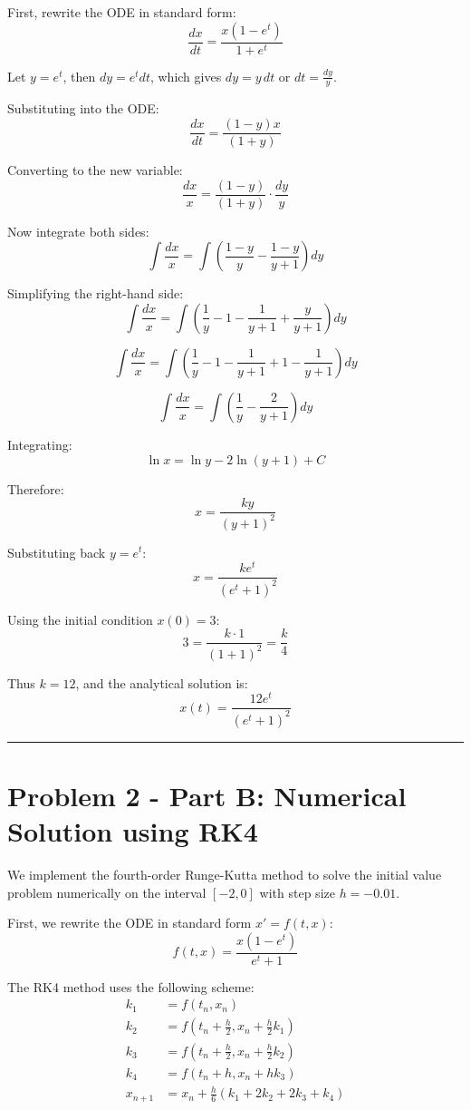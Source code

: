First, rewrite the ODE in standard form:
$$\frac{dx}{dt} = \frac{x(1-e^t)}{1+e^t}$$

Let $y = e^t$, then $dy = e^t dt$, which gives $dy = y\, dt$ or $dt = \frac{dy}{y}$.

Substituting into the ODE:
$$\frac{dx}{dt} = \frac{(1-y)x}{(1+y)}$$

Converting to the new variable:
$$\frac{dx}{x} = \frac{(1-y)}{(1+y)} \cdot \frac{dy}{y}$$

Now integrate both sides:
$$\int \frac{dx}{x} = \int \left(\frac{1-y}{y} - \frac{1-y}{y+1}\right) dy$$

Simplifying the right-hand side:
$$\int \frac{dx}{x} = \int \left(\frac{1}{y} - 1 - \frac{1}{y+1} + \frac{y}{y+1}\right) dy$$

$$\int \frac{dx}{x} = \int \left(\frac{1}{y} - 1 - \frac{1}{y+1} + 1 - \frac{1}{y+1}\right) dy$$

$$\int \frac{dx}{x} = \int \left(\frac{1}{y} - \frac{2}{y+1}\right) dy$$

Integrating:
$$\ln x = \ln y - 2\ln(y+1) + C$$

Therefore:
$$x = \frac{ky}{(y+1)^2}$$

Substituting back $y = e^t$:
$$x = \frac{ke^t}{(e^t+1)^2}$$

Using the initial condition $x(0) = 3$:
$$3 = \frac{k \cdot 1}{(1+1)^2} = \frac{k}{4}$$

Thus $k = 12$, and the analytical solution is:
$$\boxed{x(t) = \frac{12e^t}{(e^t+1)^2}}$$

\vspace{2em}
\noindent\rule{\textwidth}{0.4pt}

\clearpage
\section*{Problem 2 - Part B: Numerical Solution using RK4}

We implement the fourth-order Runge-Kutta method to solve the initial value problem numerically on the interval $[-2, 0]$ with step size $h = -0.01$.

First, we rewrite the ODE in standard form $x' = f(t, x)$:
$$f(t, x) = \frac{x(1 - e^t)}{e^t + 1}$$

The RK4 method uses the following scheme:
\begin{align*}
k_1 &= f(t_n, x_n) \\
k_2 &= f(t_n + \frac{h}{2}, x_n + \frac{h}{2}k_1) \\
k_3 &= f(t_n + \frac{h}{2}, x_n + \frac{h}{2}k_2) \\
k_4 &= f(t_n + h, x_n + hk_3) \\
x_{n+1} &= x_n + \frac{h}{6}(k_1 + 2k_2 + 2k_3 + k_4)
\end{align*}

